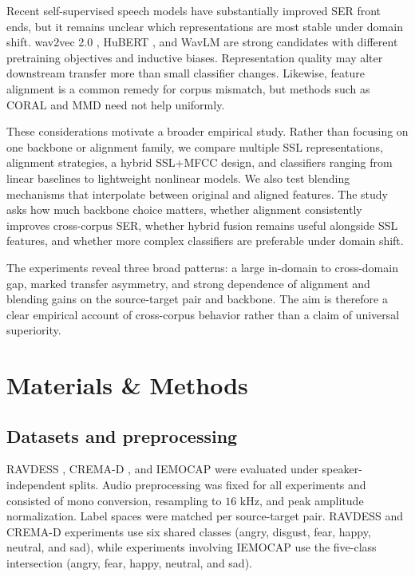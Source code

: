 \documentclass[9pt,twocolumn,letterpaper]{article}
\begin{document}
Recent self-supervised speech models have substantially improved SER front ends, but it remains unclear which representations are most stable under domain shift. wav2vec 2.0 \cite{baevski2020wav2vec}, HuBERT \cite{hsu2021hubert}, and WavLM \cite{chen2022wavlm} are strong candidates with different pretraining objectives and inductive biases. Representation quality may alter downstream transfer more than small classifier changes. Likewise, feature alignment is a common remedy for corpus mismatch, but methods such as CORAL \cite{sun2016deep} and MMD \cite{gretton2012kernel} need not help uniformly.

These considerations motivate a broader empirical study. Rather than focusing on one backbone or alignment family, we compare multiple SSL representations, alignment strategies, a hybrid SSL+MFCC design, and classifiers ranging from linear baselines to lightweight nonlinear models. We also test blending mechanisms that interpolate between original and aligned features. The study asks how much backbone choice matters, whether alignment consistently improves cross-corpus SER, whether hybrid fusion remains useful alongside SSL features, and whether more complex classifiers are preferable under domain shift.

The experiments reveal three broad patterns: a large in-domain to cross-domain gap, marked transfer asymmetry, and strong dependence of alignment and blending gains on the source-target pair and backbone. The aim is therefore a clear empirical account of cross-corpus behavior rather than a claim of universal superiority.

\section{Materials \& Methods}
\subsection{Datasets and preprocessing}
RAVDESS \cite{livingstone2018ryerson}, CREMA-D \cite{cao2014crema}, and IEMOCAP \cite{busso2008iemocap} were evaluated under speaker-independent splits. Audio preprocessing was fixed for all experiments and consisted of mono conversion, resampling to $16$ kHz, and peak amplitude normalization. Label spaces were matched per source-target pair. RAVDESS and CREMA-D experiments use six shared classes (angry, disgust, fear, happy, neutral, and sad), while experiments involving IEMOCAP use the five-class intersection (angry, fear, happy, neutral, and sad).
\end{document}
